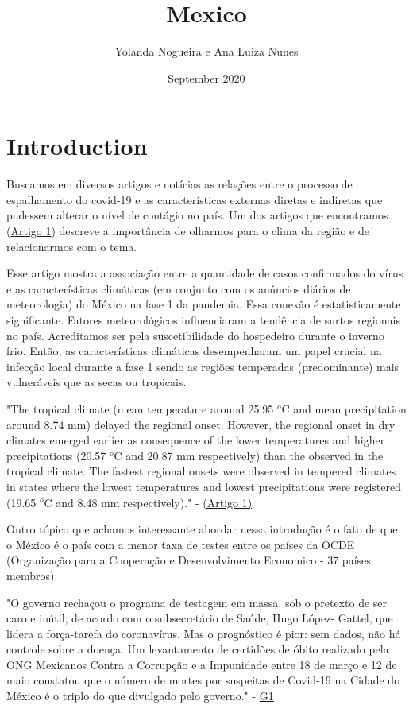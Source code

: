 \documentclass{article}
\title{Mexico}
\author{Yolanda Nogueira e Ana Luiza Nunes}
\date{September 2020}
\begin{document}
\maketitle
\section{Introduction}

Buscamos em diversos artigos e notícias as relações entre o processo de espalhamento do covid-19 e as características externas diretas e indiretas que pudessem alterar o nível de contágio no país. 
Um dos artigos que encontramos (\href{https://www.sciencedirect.com/science/article/pii/S0048969720330771}{Artigo 1}) descreve a importância de olharmos para o clima da região e de relacionarmos com o tema. 

Esse artigo mostra a associação entre a quantidade de casos confirmados do vírus e as características climáticas (em conjunto com os anúncios diários de meteorologia) do México na fase 1 da pandemia. Essa conexão é estatisticamente significante. Fatores meteorológicos influenciaram a tendência de surtos regionais no país. Acreditamos ser pela suscetibilidade do hospedeiro durante o inverno frio. Então, as características climáticas desempenharam um papel crucial na infecção local durante a fase 1 sendo as regiões temperadas (predominante) mais vulneráveis que as secas ou tropicais.

\begin{center}
    "The tropical climate (mean temperature
around 25.95 $^o$C and mean precipitation around 8.74 mm) delayed the regional onset. However, the regional
onset in dry climates emerged earlier as consequence of the lower temperatures and higher precipitations
(20.57 $^o$C and 20.87 mm respectively) than the observed in the tropical climate. The fastest regional onsets
were observed in tempered climates in states where the lowest temperatures and lowest precipitations were
registered (19.65 $^o$C and 8.48 mm respectively)."   - \href{https://www.sciencedirect.com/science/article/pii/S0048969720330771}{(Artigo 1)}
\end{center}

Outro tópico que achamos interessante abordar nessa introdução é o fato de que o México é o país com a menor taxa de testes entre os países da OCDE (Organização para a Cooperação e Desenvolvimento Economico - 37 países membros). 

\begin{center}
    "O governo rechaçou o programa de testagem em massa, sob o pretexto de ser caro e inútil, de acordo com o subsecretário de Saúde, Hugo López- Gattel, que lidera a força-tarefa do coronavírus. Mas o prognóstico é pior: sem dados, não há controle sobre a doença. Um levantamento de certidões de óbito realizado pela ONG Mexicanos Contra a Corrupção e a Impunidade entre 18 de março e 12 de maio constatou que o número de mortes por suspeitas de Covid-19 na Cidade do México é o triplo do que divulgado pelo governo." - \href{https://g1.globo.com/mundo/blog/sandra-cohen/post/2020/06/05/mexico-sai-da-quarentena-no-pico-da-pandemia.ghtml}{G1}
\end{center}
\end{document}
